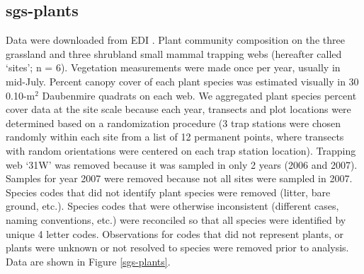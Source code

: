 \documentclass[11pt, oneside]{article}
\begin{document}
\subsection{sgs-plants}
Data were downloaded from EDI \citep{sgs-plants}.
Plant community composition on the three grassland and three shrubland small mammal trapping webs (hereafter called `sites'; n = 6). 
Vegetation measurements were made once per year, usually in mid-July. 
Percent canopy cover of each plant species was estimated visually in 30 0.10-m$^2$ Daubenmire quadrats on each web. 
We aggregated plant species percent cover data at the site scale because each year, transects and plot locations were determined based on a randomization procedure (3 trap stations were chosen randomly within each site from a list of 12 permanent points, where transects with random orientations were centered on each trap station location). 
Trapping web `31W' was removed because it was sampled in only 2 years (2006 and 2007).
Samples for year 2007 were removed because not all sites were sampled in 2007.
Species codes that did not identify plant species were removed (litter, bare ground, etc.).
Species codes that were otherwise inconsistent (different cases, naming conventions, etc.) were reconciled so that all species were identified by unique 4 letter codes.
Observations for codes that did not represent plants, or plants were unknown or not resolved to species were removed prior to analysis.
Data are shown in Figure \ref{sgs-plants}.
\end{document}
